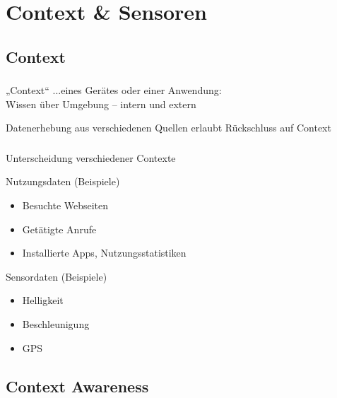 \section{Context \& Sensoren}

\subsection{Context}

\begin{frame}
    \frametitle{\insertsubsection} 
    \begin{block}{„Context“ \cite{context2015}}
        \vspace{0.3em}
        \small 
        ...eines Gerätes oder einer Anwendung:\\
        \vspace{1em}
        \normalsize
        Wissen über Umgebung -- intern und extern
    \end{block}
    \vspace{1em}
    Datenerhebung aus verschiedenen Quellen erlaubt Rückschluss auf Context
\end{frame}

\begin{frame}
    \frametitle{\insertsubsection} 
    Unterscheidung verschiedener Contexte \cite{context2015} 
    \begin{block}{Nutzungsdaten (Beispiele)}
        \begin{itemize}%
            \setlength\itemsep{0.5em}
            \item Besuchte Webseiten
            \item Getätigte Anrufe
            \item Installierte Apps, Nutzungsstatistiken
        \end{itemize}
    \end{block}
    \vspace{0.5em}
    \begin{block}{Sensordaten (Beispiele)}
        \begin{itemize}%
            \setlength\itemsep{0.5em}
            \item Helligkeit
            \item Beschleunigung
            \item GPS
        \end{itemize}
    \end{block}
\end{frame}

\subsection{Context Awareness}

